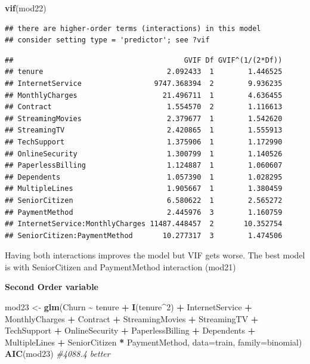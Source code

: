 \documentclass[
  twoside]{article}
\newenvironment{Shaded}{\begin{snugshade}}{\end{snugshade}}
\newcommand{\AttributeTok}[1]{\textcolor[rgb]{0.13,0.29,0.53}{#1}}
\newcommand{\CommentTok}[1]{\textcolor[rgb]{0.56,0.35,0.01}{\textit{#1}}}
\newcommand{\DecValTok}[1]{\textcolor[rgb]{0.00,0.00,0.81}{#1}}
\newcommand{\FunctionTok}[1]{\textcolor[rgb]{0.13,0.29,0.53}{\textbf{#1}}}
\newcommand{\NormalTok}[1]{#1}
\newcommand{\OtherTok}[1]{\textcolor[rgb]{0.56,0.35,0.01}{#1}}
\newcommand{\SpecialCharTok}[1]{\textcolor[rgb]{0.81,0.36,0.00}{\textbf{#1}}}
\begin{document}
\begin{Shaded}
\begin{Highlighting}[]
\FunctionTok{vif}\NormalTok{(mod22)}
\end{Highlighting}
\end{Shaded}

\begin{verbatim}
## there are higher-order terms (interactions) in this model
## consider setting type = 'predictor'; see ?vif
\end{verbatim}

\begin{verbatim}
##                                        GVIF Df GVIF^(1/(2*Df))
## tenure                             2.092433  1        1.446525
## InternetService                 9747.368394  2        9.936235
## MonthlyCharges                    21.496711  1        4.636455
## Contract                           1.554570  2        1.116613
## StreamingMovies                    2.379677  1        1.542620
## StreamingTV                        2.420865  1        1.555913
## TechSupport                        1.375906  1        1.172990
## OnlineSecurity                     1.300799  1        1.140526
## PaperlessBilling                   1.124887  1        1.060607
## Dependents                         1.057390  1        1.028295
## MultipleLines                      1.905667  1        1.380459
## SeniorCitizen                      6.580622  1        2.565272
## PaymentMethod                      2.445976  3        1.160759
## InternetService:MonthlyCharges 11487.448457  2       10.352754
## SeniorCitizen:PaymentMethod       10.277317  3        1.474506
\end{verbatim}

Having both interactions improves the model but VIF gets worse. The best
model is with SeniorCitizen and PaymentMethod interaction (mod21)

\textbf{Second Order variable}

\begin{Shaded}
\begin{Highlighting}[]
\NormalTok{mod23 }\OtherTok{\textless{}{-}} \FunctionTok{glm}\NormalTok{(Churn }\SpecialCharTok{\textasciitilde{}}\NormalTok{ tenure }\SpecialCharTok{+} \FunctionTok{I}\NormalTok{(tenure}\SpecialCharTok{\^{}}\DecValTok{2}\NormalTok{) }\SpecialCharTok{+}\NormalTok{ InternetService }\SpecialCharTok{+}\NormalTok{ MonthlyCharges }\SpecialCharTok{+} 
\NormalTok{               Contract }\SpecialCharTok{+}\NormalTok{ StreamingMovies }\SpecialCharTok{+}\NormalTok{ StreamingTV }\SpecialCharTok{+}\NormalTok{ TechSupport }\SpecialCharTok{+} 
\NormalTok{               OnlineSecurity }\SpecialCharTok{+}\NormalTok{ PaperlessBilling }\SpecialCharTok{+}\NormalTok{ Dependents }\SpecialCharTok{+}\NormalTok{ MultipleLines }\SpecialCharTok{+} 
\NormalTok{               SeniorCitizen }\SpecialCharTok{*}\NormalTok{ PaymentMethod, }\AttributeTok{data=}\NormalTok{train, }\AttributeTok{family=}\NormalTok{binomial)}
\FunctionTok{AIC}\NormalTok{(mod23) }\CommentTok{\#4088.4 better}
\end{Highlighting}
\end{Shaded}
\end{document}
